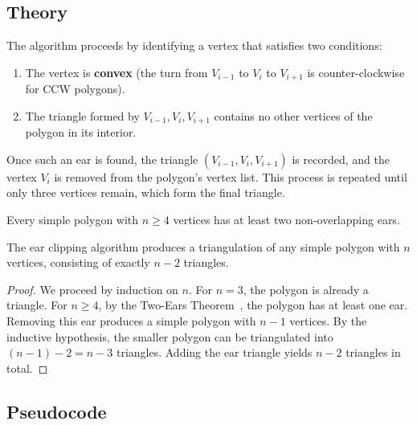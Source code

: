 \subsection{Theory}

The algorithm proceeds by identifying a vertex that satisfies two conditions:
\begin{enumerate}
\item The vertex is \textbf{convex} (the turn from $V_{i-1}$ to $V_i$ to $V_{i+1}$ is counter-clockwise for CCW polygons).
\item The triangle formed by $V_{i-1}, V_i, V_{i+1}$ contains no other vertices of the polygon in its interior.
\end{enumerate}

Once such an ear is found, the triangle $(V_{i-1}, V_i, V_{i+1})$ is recorded, and the vertex $V_i$ is removed from the polygon's vertex list. This process is repeated until only three vertices remain, which form the final triangle.

\begin{theorem}\label{thm:two_ears}
Every simple polygon with $n \ge 4$ vertices has at least two non-overlapping ears.
\end{theorem}

\begin{theorem}\label{thm:ear_clipping_correctness}
The ear clipping algorithm produces a triangulation of any simple polygon with $n$ vertices, consisting of exactly $n - 2$ triangles.
\end{theorem}
\begin{proof}
We proceed by induction on $n$. For $n = 3$, the polygon is already a triangle. For $n \ge 4$, by the Two-Ears Theorem~\cite{meisters1975}, the polygon has at least one ear. Removing this ear produces a simple polygon with $n - 1$ vertices. By the inductive hypothesis, the smaller polygon can be triangulated into $(n-1) - 2 = n - 3$ triangles. Adding the ear triangle yields $n - 2$ triangles in total.
\end{proof}



\subsection{Pseudocode}

